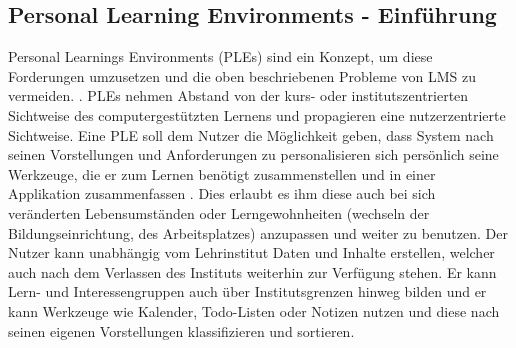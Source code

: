 \subsection{Personal Learning Environments - Einführung}
Personal Learnings Environments (PLEs) sind ein Konzept, um diese Forderungen umzusetzen und die oben beschriebenen Probleme von LMS zu vermeiden. \cite{Attwell2007}. PLEs nehmen Abstand von der kurs- oder institutszentrierten Sichtweise des computergestützten Lernens und propagieren eine nutzerzentrierte Sichtweise. Eine PLE soll dem Nutzer die Möglichkeit geben, dass System nach seinen Vorstellungen und Anforderungen zu personalisieren sich persönlich seine Werkzeuge, die er zum Lernen benötigt zusammenstellen und in einer Applikation zusammenfassen \cite{VanHarmelen}. Dies erlaubt es ihm diese auch bei sich veränderten Lebensumständen oder Lerngewohnheiten (wechseln der Bildungseinrichtung, des Arbeitsplatzes) anzupassen und weiter zu benutzen. Der Nutzer kann unabhängig vom Lehrinstitut Daten und Inhalte erstellen, welcher auch nach dem Verlassen des Instituts weiterhin zur Verfügung stehen. Er kann Lern- und Interessengruppen auch über Institutsgrenzen hinweg bilden \cite{Schaffert2008a} und er kann Werkzeuge wie Kalender, Todo-Listen oder Notizen nutzen und diese nach seinen eigenen Vorstellungen klassifizieren und sortieren.